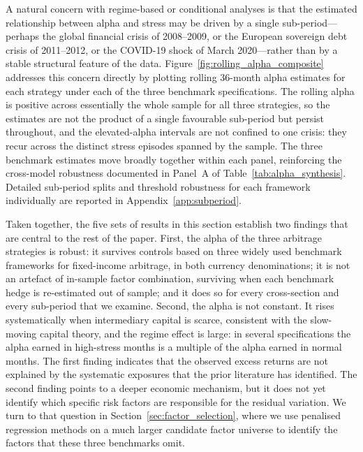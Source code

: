 A natural concern with regime-based or conditional analyses is that the
estimated relationship between alpha and stress may be driven by a
single sub-period---perhaps the global financial crisis of 2008--2009,
or the European sovereign debt crisis of 2011--2012, or the COVID-19
shock of March 2020---rather than by a stable structural feature of the
data. Figure~\ref{fig:rolling_alpha_composite} addresses this concern
directly by plotting rolling 36-month alpha estimates for each strategy
under each of the three benchmark specifications. The rolling alpha is
positive across essentially the whole sample for all three strategies,
so the estimates are not the product of a single favourable sub-period
but persist throughout, and the elevated-alpha intervals are not
confined to one crisis: they recur across the distinct stress episodes
spanned by the sample. The three benchmark estimates move broadly
together within each panel, reinforcing the cross-model robustness
documented in Panel~A of Table~\ref{tab:alpha_synthesis}. Detailed
sub-period splits and threshold robustness for each framework
individually are reported in Appendix~\ref{app:subperiod}.

Taken together, the five sets of results in this section establish two
findings that are central to the rest of the paper. First, the alpha of
the three arbitrage strategies is robust: it survives controls based on
three widely used benchmark frameworks for fixed-income arbitrage, in
both currency denominations; it is not an artefact of in-sample factor
combination, surviving when each benchmark hedge is re-estimated out of
sample; and it does so for every cross-section and every sub-period that
we examine. Second, the alpha is not constant. It
rises systematically when intermediary capital is scarce, consistent with the
slow-moving capital theory, and the regime effect is large: in several
specifications the alpha earned in high-stress months is a multiple of
the alpha earned in normal months. The first finding indicates that the observed excess returns are not
explained by the systematic exposures that the prior literature has
identified. The second finding points to a deeper economic mechanism,
but it does not yet identify which specific risk factors are
responsible for the residual variation. We turn to that question in
Section~\ref{sec:factor_selection}, where we use penalised regression
methods on a much larger candidate factor universe to identify the
factors that these three benchmarks omit.